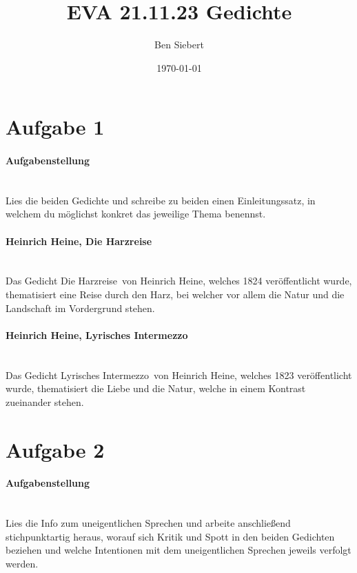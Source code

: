 \documentclass[12pt, a4paper]{article}
\begin{document}
    \renewcommand{\baselinestretch}{1.5}\normalsize

    \title{EVA 21.11.23 Gedichte}
    \author{Ben Siebert}
    \date{\today}
    \maketitle

    \thispagestyle{empty}
    \clearpage

    \newpage
    \setcounter{page}{1}

    \section{Aufgabe 1}
    \paragraph{Aufgabenstellung} \mbox{} \\
    Lies die beiden Gedichte und schreibe zu beiden einen Einleitungssatz, in welchem du möglichst konkret das jeweilige Thema benennst.

    \paragraph{Heinrich Heine, Die Harzreise} \mbox{} \\
    Das Gedicht \dq Die Harzreise\dq\ von Heinrich Heine, welches 1824 veröffentlicht wurde, thematisiert eine Reise durch den Harz, bei welcher vor allem die Natur und die Landschaft im Vordergrund stehen.

    \paragraph{Heinrich Heine, Lyrisches Intermezzo} \mbox{} \\
    Das Gedicht \dq Lyrisches Intermezzo\dq\ von Heinrich Heine, welches 1823 veröffentlicht wurde, thematisiert die Liebe und die Natur, welche in einem Kontrast zueinander stehen.

    \section{Aufgabe 2}
    \paragraph{Aufgabenstellung} \mbox{} \\
    Lies die Info zum uneigentlichen Sprechen und arbeite anschließend stichpunktartig heraus, worauf sich Kritik und Spott in den beiden Gedichten beziehen und welche Intentionen mit dem uneigentlichen Sprechen jeweils verfolgt werden.
\end{document}
